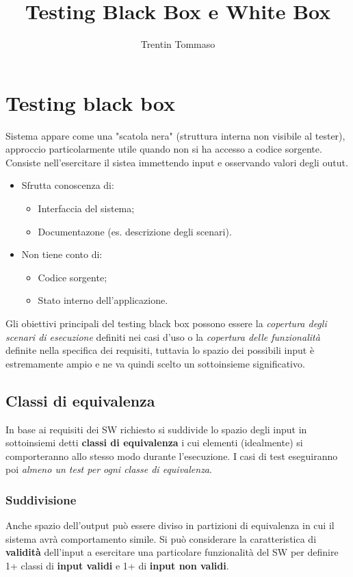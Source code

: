 \documentclass{article}
\title{Testing Black Box e White Box}
\author{Trentin Tommaso}
\begin{document}
\maketitle
\tableofcontents
\newpage

  \section{Testing black box}
    Sistema appare come una "scatola nera" (struttura interna non visibile al tester), approccio particolarmente utile quando non si ha accesso a codice sorgente. Consiste nell'esercitare il sistea immettendo input e osservando valori degli outut.
    \begin{itemize}
        \item Sfrutta conoscenza di:
          \begin{itemize}
              \item Interfaccia del sistema;
              \item Documentazone (es. descrizione degli scenari).
          \end{itemize}
        \item Non tiene conto di:
          \begin{itemize}
              \item Codice sorgente;
              \item Stato interno dell'applicazione.
          \end{itemize}
    \end{itemize}
    Gli obiettivi principali del testing black box possono essere la \textit{copertura degli scenari di esecuzione} definiti nei casi d'uso o la \textit{copertura delle funzionalità} definite nella specifica dei requisiti, tuttavia lo spazio dei possibili input è estremamente ampio e ne va quindi scelto un sottoinsieme significativo.
    \subsection{Classi di equivalenza}
      In base ai requisiti dei SW richiesto si suddivide lo spazio degli input in sottoinsiemi detti \textbf{classi di equivalenza} i cui elementi (idealmente) si comporteranno allo stesso modo durante l'esecuzione. I casi di test eseguiranno poi \textit{almeno un test per ogni classe di equivalenza}.
      \subsubsection{Suddivisione}
        Anche spazio dell'output può essere diviso in partizioni di equivalenza in cui il sistema avrà comportamento simile. Si può considerare la caratteristica di \textbf{validità} dell'input a esercitare una particolare funzionalità del SW per definire 1+ classi di \textbf{input validi} e 1+ di \textbf{input non validi}.
\end{document}
